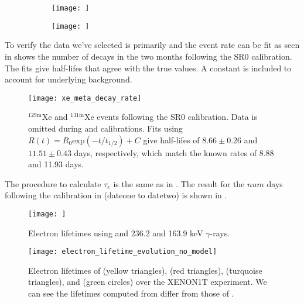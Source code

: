 \begin{figure}
    \begin{subfigure}[t]{0.4\textwidth}
        \texttt{[image: ]}
    \end{subfigure}%
    \begin{subfigure}[t]{0.65\textwidth}
        \texttt{[image: ]}
    \end{subfigure}
    \caption{}
	\label{fig:electron_lifetimes_measurement_gammas_s1_s2}
\end{figure}

To verify the data we've selected is primarily  and  the event rate can be fit as seen in
 shows the number of decays in the two months following the
SR0 \ambe calibration.  The fits give half-lifes that agree with the true values.  A constant is included to account for underlying
background.

\begin{figure}
\centering
\texttt{[image: xe\_meta\_decay\_rate]}
\caption{$\mathrm{^{129m}Xe}$ and $\mathrm{^{131m}Xe}$ events following the SR0 \ambe calibration.  Data is omitted during \metakr
and  calibrations.  Fits using $R(t) = R_0 \mathrm{exp}(-t/t_{1/2}) + C$ give half-lifes of $8.66 \pm 0.26$ and
$11.51 \pm 0.43$ days, respectively, which match the known rates of 8.88 and 11.93 days.}
\label{fig:electron_lifetimes_measurement_gammas_decay_rate}
\end{figure}

The procedure to calculate $\tau_e$ is the same as in .  The result for the
$num$ days following the \ambe calibration in  (dateone to datetwo)
is shown in .

\begin{figure}
\centering
\texttt{[image: ]}
\caption{Electron lifetimes using  and  236.2 and 163.9 keV $\gamma$-rays.}
\label{fig:electron_lifetimes_measurement_gammas_elifetime}
\end{figure}

\begin{figure}
\centering
\texttt{[image: electron\_lifetime\_evolution\_no\_model]}
\caption{Electron lifetimes of  (yellow triangles),  (red triangles),  (turquoise triangles), and
\metakr (green circles) over the
XENON1T experiment.  We can see the lifetimes computed from \alphadecays differ from those of \metakr.}
\label{fig:electron_lifetimes_evolution_no_model}
\end{figure}



